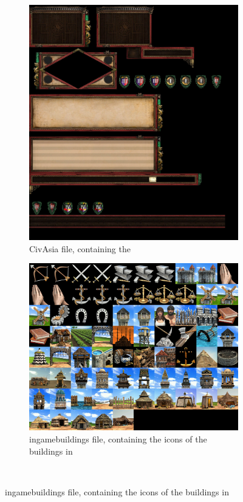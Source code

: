     \begin{figure}
        \centering
        \begin{subfigure}{0.48\textwidth}
            \centering
            \includegraphics[width=1.0\textwidth]{src/images/CivAsia}
            \caption{CivAsia file, containing the }
            \label{fig:CivAsia}
        \end{subfigure}\quad%
        \begin{subfigure}{0.48\textwidth}
            \centering
            \includegraphics[width=1.0\textwidth]{src/images/ingamebuildings}
            \caption{ingamebuildings file, containing the icons of the buildings in }
            \label{fig:ingamebuildings}
        \end{subfigure}\\%
    \end{figure}

